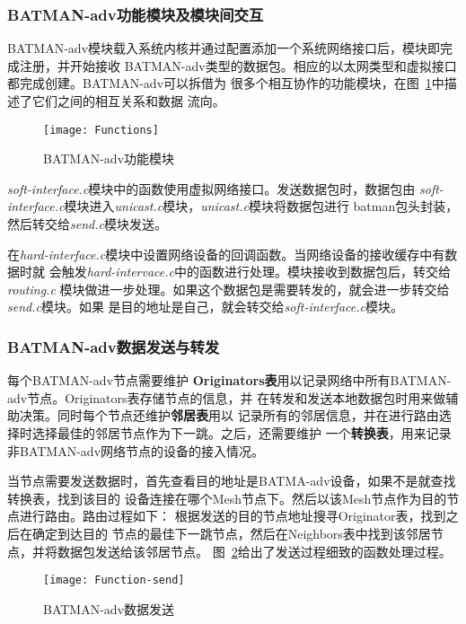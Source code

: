 \subsubsection{BATMAN-adv功能模块及模块间交互}
BATMAN-adv模块载入系统内核并通过配置添加一个系统网络接口后，模块即完成注册，并开始接收
BATMAN-adv类型的数据包。相应的以太网类型和虚拟接口都完成创建。BATMAN-adv可以拆借为
很多个相互协作的功能模块，在图~\ref{fig:functions}中描述了它们之间的相互关系和数据
流向。
\begin{figure}[H] %
  \centering
  \texttt{[image: Functions]}
  \caption{BATMAN-adv功能模块}
  \label{fig:functions}
\end{figure}

\emph{soft-interface.c}模块中的函数使用虚拟网络接口。发送数据包时，数据包由
\emph{soft-interface.c}模块进入\emph{unicast.c}模块，\emph{unicast.c}模块将数据包进行
batman包头封装，然后转交给\emph{send.c}模块发送。

在\emph{hard-interface.c}模块中设置网络设备的回调函数。当网络设备的接收缓存中有数据时就
会触发\emph{hard-intervace.c}中的函数进行处理。模块接收到数据包后，转交给\emph{routing.c}
模块做进一步处理。如果这个数据包是需要转发的，就会进一步转交给\emph{send.c}模块。如果
是目的地址是自己，就会转交给\emph{soft-interface.c}模块。

\subsubsection{BATMAN-adv数据发送与转发}
每个BATMAN-adv节点需要维护
\textbf{Originators表}用以记录网络中所有BATMAN-adv节点。Originators表存储节点的信息，并
在转发和发送本地数据包时用来做辅助决策。同时每个节点还维护\textbf{邻居表}用以
记录所有的邻居信息，并在进行路由选择时选择最佳的邻居节点作为下一跳。之后，还需要维护
一个\textbf{转换表}，用来记录非BATMAN-adv网络节点的设备的接入情况。

当节点需要发送数据时，首先查看目的地址是BATMA-adv设备，如果不是就查找转换表，找到该目的
设备连接在哪个Mesh节点下。然后以该Mesh节点作为目的节点进行路由。路由过程如下：
根据发送的目的节点地址搜寻Originator表，找到之后在确定到达目的
节点的最佳下一跳节点，然后在Neighbors表中找到该邻居节点，并将数据包发送给该邻居节点。
图~\ref{fig:function-send}给出了发送过程细致的函数处理过程。
\begin{figure}[H] %
  \centering
  \texttt{[image: Function-send]}
  \caption{BATMAN-adv数据发送}
  \label{fig:function-send}
\end{figure}

